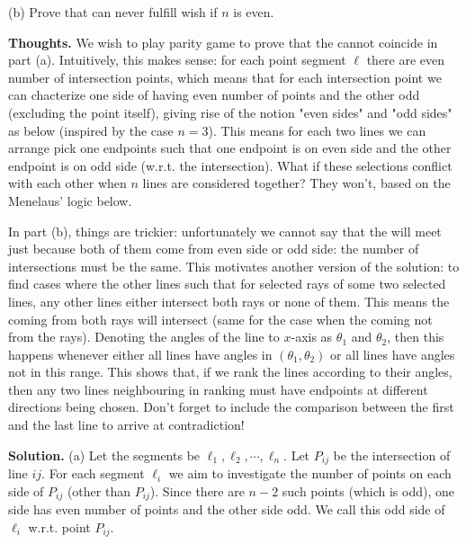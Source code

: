 \documentclass[11pt,a4paper]{article}
\begin{document}
\begin{itemize}
(b) Prove that \person can never fulfill \possesive wish if $n$ is even.

\textbf{Thoughts.} 
We wish to play parity game to prove that the \animals cannot coincide in part (a). 
Intuitively, this makes sense: 
for each point segment $\ell$ there are even number of intersection points, 
which means that for each intersection point we can chacterize one side of having even number of points and the other odd 
(excluding the point itself), giving rise of the notion "even sides" and "odd sides" as below (inspired by the case $n=3$). 
This means for each two lines we can arrange pick one endpoints such that one endpoint is on even side and the other endpoint is on odd side (w.r.t. the intersection). 
What if these selections conflict with each other when $n$ lines are considered together? 
They won't, based on the Menelaus' logic below. 

In part (b), things are trickier: unfortunately we cannot say that the \animals will meet just because both of them come from even side or odd side: the number of intersections must be the same. 
This motivates another version of the solution: 
to find cases where the other lines such that for selected rays of some two selected lines, any other lines either intersect both rays or none of them. 
This means the \animals coming from both rays will intersect (same for the case when the \animals coming not from the rays). 
Denoting the angles of the line to $x$-axis as $\theta_1$ and $\theta_2$, then this happens whenever either all lines have angles in $(\theta_1, \theta_2)$ or all lines have angles not in this range. 
This shows that, if we rank the lines according to their angles, then any two lines neighbouring in ranking must have endpoints at different directions being chosen. 
Don't forget to include the comparison between the first and the last line to arrive at contradiction!

\textbf{Solution.} (a) Let the segments be $\ell_1, \ell_2, \cdots , \ell_n$. 
Let $P_{ij}$ be the intersection of line $ij$. For each segment $\ell_i$ we aim to investigate the number of points on each side of $P_{ij}$ (other than $P_{ij}$). 
Since there are $n-2$ such points (which is odd), 
one side has even number of points and the other side odd. 
We call this odd side of $\ell_i$ w.r.t. point $P_{ij}$. 


\end{itemize}
\end{document}
